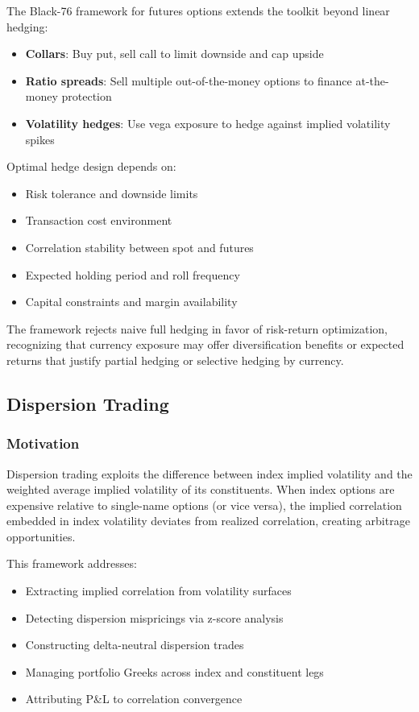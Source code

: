 The Black-76 framework for futures options extends the toolkit beyond linear hedging:
\begin{itemize}
  \item \textbf{Collars}: Buy put, sell call to limit downside and cap upside
  \item \textbf{Ratio spreads}: Sell multiple out-of-the-money options to finance at-the-money protection
  \item \textbf{Volatility hedges}: Use vega exposure to hedge against implied volatility spikes
\end{itemize}

Optimal hedge design depends on:
\begin{itemize}
  \item Risk tolerance and downside limits
  \item Transaction cost environment
  \item Correlation stability between spot and futures
  \item Expected holding period and roll frequency
  \item Capital constraints and margin availability
\end{itemize}

The framework rejects naive full hedging in favor of risk-return optimization, recognizing that currency exposure may offer diversification benefits or expected returns that justify partial hedging or selective hedging by currency.

\subsection{Dispersion Trading}

\subsubsection{Motivation}

Dispersion trading exploits the difference between index implied volatility and the weighted average implied volatility of its constituents. When index options are expensive relative to single-name options (or vice versa), the implied correlation embedded in index volatility deviates from realized correlation, creating arbitrage opportunities.

This framework addresses:
\begin{itemize}
  \item Extracting implied correlation from volatility surfaces
  \item Detecting dispersion mispricings via z-score analysis
  \item Constructing delta-neutral dispersion trades
  \item Managing portfolio Greeks across index and constituent legs
  \item Attributing P\&L to correlation convergence
\end{itemize}

